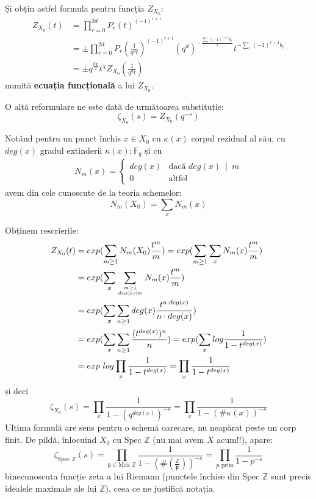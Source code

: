 \documentclass[13pt,openany,oneside]{book}
\begin{document}
Și obțin astfel formula pentru funcția $Z_{X_0}$:
\begin{align*}
Z_{X_0}(t)&=\prod_{r=0}^{2d} P_r(t)^{(-1)^{r+1}}\\
&=\pm \prod_{r=0}^{2d} P_r(\frac{1}{q^dt})^{(-1)^{r+1}} (q^d)^{-\frac{\sum\limits_r (-1)^{r+1} b_r}{2}} t^{-\sum\limits_r (-1)^{r+1} b_r}\\
&=\pm q^{\frac{d\chi}{2}} t^{\chi} Z_{X_0}(\frac{1}{q^dt})
\end{align*}
numită {\bf ecuația funcțională} a lui $Z_{X_0}$.

O altă reformulare ne este dată de următoarea substituție:
$$\zeta_{X_0}(s)=Z_{X_0}(q^{-s})$$

Notând pentru un punct închis $x \in {X_0}$ cu $\kappa(x)$ corpul rezidual al său, cu $deg(x)$ gradul extinderii $\kappa(x) : \mathbb{F}_q$ și cu
\begin{align*}
N_m(x) = \left\{
     \begin{array}{lr}
       deg(x) & \text{dacă } deg(x)\ \mid \ m\\
       0 & \text{altfel}
     \end{array}
   \right.
\end{align*}
avem din cele cunoscute de la teoria schemelor:
$$N_m(X_0)=\sum\limits_x N_m(x)$$

Obținem rescrierile:
\begin{align*}
Z_{X_0}(t)&=exp(\sum_{m\geq 1} N_m(X_0) \frac{t^m}{m}) = exp(\sum_{m\geq 1} \sum\limits_x N_m(x) \frac{t^m}{m})\\
&=exp(\sum_x \sum_{m \geq 1 \atop deg(x) \mid  m} N_m(x) \frac{t^m}{m})\\
&=exp(\sum_x \sum_{n \geq 1} deg(x) \frac{t^{n\cdot deg(x)}}{n \cdot deg(x)})\\
&=exp(\sum_x \sum_{n\geq 1} \frac{(t^{deg(x)})^n}{n})=exp(\sum_x log \frac{1}{1-t^{deg(x)}})\\
&=exp\ log \prod_x \frac{1}{1-t^{deg(x)}} = \prod_x \frac{1}{1-t^{deg(x)}}
\end{align*}
și deci
$$\zeta_{X_0}(s)=\prod_x \frac{1}{1-(q^{deg(x)})^{-s}} = \prod_x \frac{1}{1-(\#\kappa(x))^{-s}}$$
Ultima formulă are sens pentru o schemă oarecare, nu neapărat peste un corp finit. De pildă, înlocuind $X_0$ cu $\text{Spec }\mathbb{Z}$ (nu mai avem $X$ acum!!), apare:
$$\zeta_{\text{Spec }\mathbb{Z}}(s)=\prod_{\mathfrak{p} \in \text{Max }\mathbb{Z}} \frac{1}{1-(\#(\frac{\mathbb{Z}}{\mathfrak{p}}))^{-s}} = \prod_{p\text{ prim}} \frac{1}{1-p^{-s}}$$
binecunoscuta funcție zeta a lui Riemann (punctele închise din $\text{Spec }\mathbb{Z}$ sunt precis idealele maximale ale lui $\mathbb{Z}$), ceea ce ne justifică notația.
\end{document}
